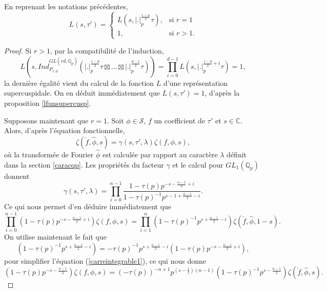 \begin{proposition}
En reprenant les notations précédentes,
\begin{equation}
L(s, \tau') = \begin{cases}
    L(s,|.|_p^{\frac{1-n}{2}}\tau),& \text{si } r=1\\
    1,              & \text{si } r > 1.
\end{cases}
\end{equation}
\end{proposition}

\begin{proof}
Si $r > 1$, par la compatibilité de l'induction,
\begin{equation}
L(s, Ind_{P_{r,d}}^{GL(rd, \mathbb{Q}_p)}(|.|_p^{\frac{1-d}{2}}\tau \boxtimes ... \boxtimes |.|_p^{\frac{d-1}{2}}\tau)) = \prod_{i=0}^{d-1} L(s, |.|_p^{\frac{1-d}{2}+i}\tau)=1,
\end{equation}
la dernière égalité vient du calcul de la fonction $L$ d'une représentation supercuspidale. On en déduit immédiatement que $L(s,\tau')=1$, d'après la proposition \ref{lfunsupercusp}.

Supposons maintenant que $r=1$. Soit $\phi \in \mathcal{S}$, $f$ un coefficient de $\tau'$ et $s \in \mathbb{C}$. Alors, d'après l'équation fonctionnelle,
\begin{equation}
\zeta(\check{f}, \hat{\phi}, s) = \gamma(s, \tau', \lambda)\zeta(f, \phi, s),
\end{equation}
où la transformée de Fourier $\hat{\phi}$ est calculée par rapport au caractère $\lambda$ définit dans la section \ref{caracqp}.
Les propriétés du facteur $\gamma$ et le calcul pour $GL_1(\mathbb{Q}_p)$ donnent
\begin{equation}
\gamma(s, \tau', \lambda) = \prod_{i=0}^{n-1} \frac{1-\tau(p)p^{-s-\frac{n-1}{2}+i}}{1-\tau(p)^{-1}p^{s-1+\frac{n-1}{2}-i}}.
\end{equation}
Ce qui nous permet d'en déduire immédiatement que
\begin{equation}
\label{carreintegrable1}
\prod_{i=0}^{n-1}(1-\tau(p)p^{-s-\frac{n-1}{2}+i})\zeta(f, \phi, s) =
\prod_{i=1}^{n}(1-\tau(p)^{-1}p^{s+\frac{n-1}{2}-i})\zeta(\check{f}, \hat{\phi}, 1-s).
\end{equation}
On utilise maintenant le fait que
\begin{equation}
(1-\tau(p)^{-1}p^{s+\frac{n-1}{2}-i}) = -\tau(p)^{-1}p^{s+\frac{n-1}{2}-i}(1-\tau(p)p^{-s-\frac{n-1}{2}+i}),
\end{equation}
pour simplifier l'équation (\ref{carreintegrable1}), ce qui nous donne
\begin{equation}
\label{carreintegrable2}
(1-\tau(p)p^{-s-\frac{n-1}{2}})\zeta(f, \phi, s) = (-\tau(p))^{-n+1}
p^{(s-\frac{1}{2})(n-1)}(1-\tau(p)^{-1}p^{s-\frac{n-1}{2}})\zeta(\check{f}, \hat{\phi}, s).
\end{equation}


\end{proof}
